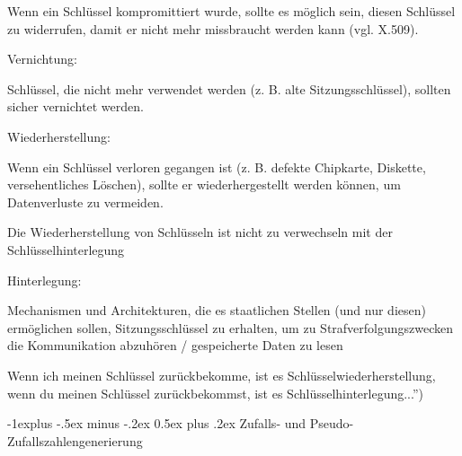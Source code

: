 \documentclass[a4paper]{article}
\makeatletter
\renewcommand{\subsection}{\@startsection{subsection}{2}{0mm}%
 {-1explus -.5ex minus -.2ex}%
 {0.5ex plus .2ex}%
 {\normalfont\normalsize\bfseries}}
\makeatother
\begin{document}
\begin{multicols}{3}
\begin{itemize*}
            \begin{itemize*}
                  \item Wenn ein Schlüssel kompromittiert wurde, sollte es möglich sein, diesen Schlüssel zu widerrufen, damit er nicht mehr missbraucht werden kann (vgl. X.509).
            \end{itemize*}
            \item
            Vernichtung:

            \begin{itemize*}
                  \item Schlüssel, die nicht mehr verwendet werden (z. B. alte Sitzungsschlüssel), sollten sicher vernichtet werden.
            \end{itemize*}
            \item
            Wiederherstellung:

            \begin{itemize*}
                  \item Wenn ein Schlüssel verloren gegangen ist (z. B. defekte Chipkarte, Diskette, versehentliches Löschen), sollte er wiederhergestellt werden können, um Datenverluste zu vermeiden.
                  \item Die Wiederherstellung von Schlüsseln ist nicht zu verwechseln mit der Schlüsselhinterlegung
            \end{itemize*}
            \item
            Hinterlegung:

            \begin{itemize*}
                  \item Mechanismen und Architekturen, die es staatlichen Stellen (und nur diesen) ermöglichen sollen, Sitzungsschlüssel zu erhalten, um zu Strafverfolgungszwecken die Kommunikation abzuhören / gespeicherte Daten zu lesen
                  \begin{itemize*} \item Wenn ich meinen Schlüssel zurückbekomme, ist es Schlüsselwiederherstellung, wenn du meinen Schlüssel zurückbekommst, ist es Schlüsselhinterlegung...'') \end{itemize*}
            \end{itemize*}
      \end{itemize*}


      \subsection{Zufalls- und
            Pseudo-Zufallszahlengenerierung}


\end{multicols}
\end{document}
